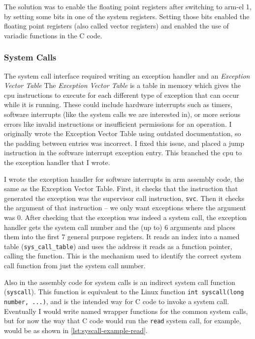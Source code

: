 \documentclass{article}
\begin{document}
The solution was to enable the floating point registers after switching to
\gls{arm-el} 1, by setting some bits in one of the system registers. Setting
those bits enabled the floating point registers (also called vector registers)
and enabled the use of variadic functions in the C code.

\subsubsection{System Calls}
\label{sec:impl_syscalls}
The system call interface required writing an exception handler and an
\emph{Exception Vector Table} The \emph{Exception Vector Table} is a
table in memory which gives the \gls{cpu} instructions to execute for each
different type of exception that can occur while it is running. These could
include hardware interrupts such as timers, software interrupts (like the
system calls we are interested in), or more serious errors like invalid
instructions or insufficient permissions for an operation. I originally wrote
the Exception Vector Table using outdated documentation, so the padding between
entries was incorrect. I fixed this issue, and placed a jump instruction in the
software interrupt exception entry. This branched the \gls{cpu} to the
exception handler that I wrote.

I wrote the exception handler for software interrupts in \gls{arm} assembly
code, the same as the Exception Vector Table. First, it checks that the
instruction that generated the exception was the supervisor call instruction,
\verb!svc!. Then it checks the argument of that instruction -- we only want
exceptions where the argument was 0. After checking that the exception was
indeed a system call, the exception handler gets the system call number and the
(up to) 6 arguments and places them into the first 7 general purpose registers.
It reads an index into a named table (\verb!sys_call_table!) and uses the
address it reads as a function pointer, calling the function. This is the
mechanism used to identify the correct system call function from just the
system call number.

Also in the assembly code for system calls is an indirect system call function
(\verb!syscall!). This function is equivalent to the Linux function
\verb!int syscall(long number, ...)!, and is the intended way for C code to
invoke a system call. Eventually I would write named wrapper functions for the
common system calls, but for now the way that C code would run the
\texttt{read} system call, for example, would be as shown in
\autoref{lst:syscall-example-read}.
\end{document}
